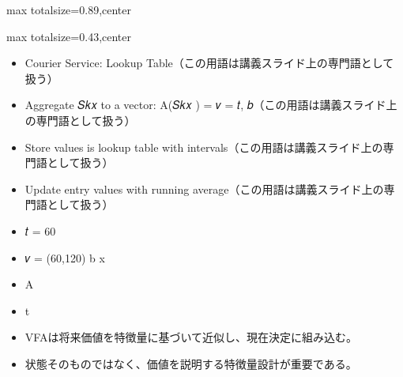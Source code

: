 \begin{minipage}[t]{0.58\textwidth}
\begin{adjustbox}{max totalsize={\textwidth}{0.89\textheight},center}
\begin{minipage}{\textwidth}
\end{minipage}
\end{adjustbox}
\end{minipage}


\clearpage
{}
\begin{minipage}[t]{0.405\textwidth}
\begin{adjustbox}{max totalsize={\textwidth}{0.43\textheight},center}
\begin{minipage}{\textwidth}\scriptsize
{}\begin{itemize}
\item Courier Service: Lookup Table（この用語は講義スライド上の専門語として扱う）
\item Aggregate 𝑆𝑘𝑥 to a vector: A(𝑆𝑘𝑥 ) = 𝑣 = 𝑡, 𝑏（この用語は講義スライド上の専門語として扱う）
\item Store values is lookup table with intervals（この用語は講義スライド上の専門語として扱う）
\item Update entry values with running average（この用語は講義スライド上の専門語として扱う）
\item 𝑡 = 60
\item 𝑣 = (60,120) b x
\item A
\item t
\end{itemize}\begin{itemize}
\item VFAは将来価値を特徴量に基づいて近似し、現在決定に組み込む。
\item 状態そのものではなく、価値を説明する特徴量設計が重要である。
\end{itemize}
\end{minipage}
\end{adjustbox}
\end{minipage}\hfill
